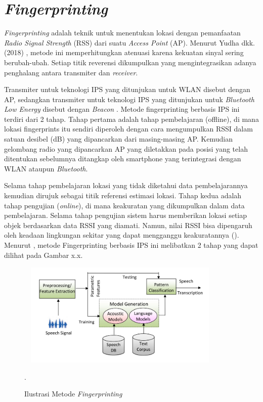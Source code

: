 \section{\textit{Fingerprinting}}
\textit{Fingerprinting} adalah teknik untuk menentukan lokasi dengan pemanfaatan \textit{Radio Signal Strength} (RSS) dari suatu \textit{Access Point }(AP). Menurut Yudha dkk. (2018) , metode ini memperhitungkan atenuasi karena kekuatan sinyal sering berubah-ubah. Setiap titik reverensi dikumpulkan yang mengintegrasikan adanya penghalang antara transmiter dan \textit{receiver}.

\par Transmiter untuk teknologi IPS yang ditunjukan untuk WLAN disebut dengan AP, sedangkan transmiter untuk teknologi IPS yang ditunjukan untuk \textit{Bluetooth Low Energy} disebut dengan \textit{Beacon } \cite{puspitasari2020}. Metode fingerprinting berbasis IPS ini terdiri dari 2 tahap. Tahap pertama adalah tahap pembelajaran (offline), di mana lokasi fingerprints itu sendiri diperoleh dengan cara mengumpulkan RSSI dalam satuan desibel (dB) yang dipancarkan dari masing-masing AP. Kemudian gelombang radio yang dipancarkan AP yang diletakkan pada posisi yang telah ditentukan sebelumnya ditangkap oleh smartphone yang terintegrasi dengan WLAN ataupun \textit{Bluetooth}.

\par Selama tahap pembelajaran lokasi yang tidak diketahui data pembelajarannya kemudian dirujuk sebagai titik referensi estimasi lokasi. Tahap kedua adalah tahap pengujian (\textit{online}), di mana keakuratan yang dikumpulkan dalam data pembelajaran. Selama tahap pengujian sistem harus memberikan lokasi setiap objek berdasarkan data RSSI yang diamati. Namun, nilai RSSI bisa dipengaruh oleh keadaan lingkungan sekitar yang dapat mengganggu keakuratannya (\citep{subhan2011indoor}). Menurut \citep{yudha2018indoor}, metode Fingerprinting berbasis IPS ini melibatkan 2 tahap yang dapat dilihat pada Gambar x.x.

\begin{figure}[H]
\centering
\shadowbox
{\includegraphics [width = 10cm, height= 5cm]{gambar/sr_arsitektur}}
\caption{Ilustrasi Metode \textit{Fingerprinting} \citep{aggarwal2012}}.
\label{sr_arsitektur}
\end{figure}

